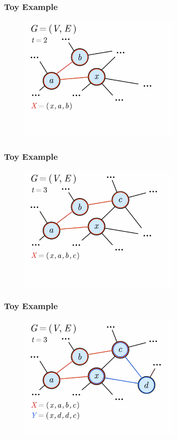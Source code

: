 \documentclass{beamer}
\begin{document}
\begin{frame}
\frametitle{Toy Example}
\begin{figure}
    \centering
    \includegraphics[trim={0 2cm 0 0}, clip, width=8cm]{diagrams/3.png}
\end{figure}
\end{frame}

\begin{frame}
\frametitle{Toy Example}
\begin{figure}
    \centering
    \includegraphics[trim={0 2cm 0 0}, clip, width=8cm]{diagrams/4.png}
\end{figure}
\end{frame}

\begin{frame}
\frametitle{Toy Example}
\begin{figure}
    \centering
    \includegraphics[trim={0 2cm 0 0}, clip, width=8cm]{diagrams/5.png}
\end{figure}
\end{frame}
\end{document}
